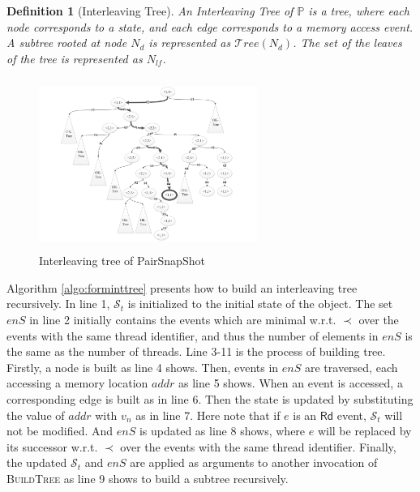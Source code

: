 \documentclass[runningheads]{llncs}
\newcommand{\eread}{\mathsf{Rd}}
\newtheorem{myDef}{Definition}
\begin{document}
\begin{myDef}[Interleaving Tree]
    An \textit{Interleaving Tree} of $\mathbb{P}$ is a tree, where each node corresponds to a state, and each edge corresponds to a memory access event. A subtree rooted at node $N_d$ is represented as $\mathcal{T}ree(N_d)$. The set of the leaves of the tree is represented as $N_{lf}$.
\end{myDef}

\begin{figure}
\centering
\vspace{-0.2cm}
\includegraphics[height = 2.2in, width = 2.8in]{pssinttree.pdf}
\vspace{-0.2cm}
\caption{Interleaving tree of PairSnapShot}\label{fig:interleavingtreeofpairsnapshot}
\end{figure}

    Algorithm \ref{algo:forminttree} presents how to build an interleaving tree recursively. In line 1, $\mathcal{S}_t$ is initialized to the initial state of the object. The set $\mathit{enS}$ in line 2 initially contains the events which are minimal w.r.t. $\prec$ over the events with the same thread identifier, and thus the number of elements in $\mathit{enS}$ is the same as the number of threads. Line 3-11 is the process of building tree. Firstly, a node is built as line 4 shows. Then, events in $\mathit{enS}$ are traversed, each accessing a memory location $addr$ as line 5 shows. When an event is accessed, a corresponding edge is built as in line 6. Then the state is updated by substituting the value of $addr$ with $v_n$ as in line 7. Here note that if $e$ is an $\eread$ event, $\mathcal{S}_t$ will not be modified. And $\mathit{enS}$ is updated as line 8 shows, where $e$ will be replaced by its successor w.r.t. $\prec$ over the events with the same thread identifier. Finally, the updated $\mathcal{S}_t$ and $\mathit{enS}$ are applied as arguments to another invocation of \textsc{BuildTree} as line 9 shows to build a subtree recursively.
\end{document}

